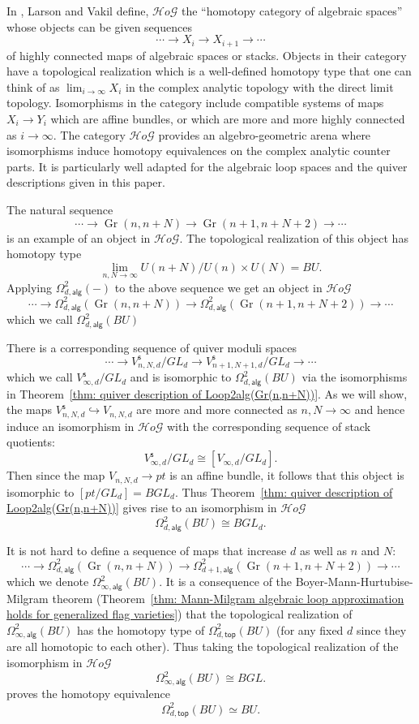 \documentclass{amsart}
\theoremstyle{definition}
\newcommand{\HoG}{\mathcal{H}o\mathcal{G}}    %
\newcommand{\alg}{\mathsf{alg}}
\newcommand{\stable}{\mathsf{s}}
\renewcommand{\top}{\mathsf{top}}
\newcommand{\Gr}{\operatorname{Gr}}
\newcommand{\LoopTwo}{\Omega^{2}_{d,\alg}}
\newcommand{\LoopTwoTop}{\Omega^{2}_{d,\top}}
\newcommand{\homotopyeq}{\simeq}
\begin{document}
In \cite{Larson-Vakil-BottPeriodicity}, Larson and Vakil define,
$\HoG$ the ``homotopy category of algebraic spaces'' whose objects can
be given sequences 
\[
\dotsb \to  X_{i} \to  X_{i+1}\to \dotsb 
\]
of highly connected maps of algebraic spaces or stacks. Objects in
their category have a topological realization which is a well-defined
homotopy type that one can think of as $\lim_{i\to \infty} X_{i}$ in
the complex analytic topology with the direct limit
topology. Isomorphisms in the category include compatible systems of
maps $X_{i} \to Y_{i}$ which are affine bundles, or which are more and
more highly connected as $i\to \infty$. The category $\HoG$ provides
an algebro-geometric arena where isomorphisms induce homotopy
equivalences on the complex analytic counter parts. It is particularly
well adapted for the algebraic loop spaces and the quiver descriptions
given in this paper.

The natural sequence
\[
\dotsb \to \Gr (n,n+N)\to \Gr (n+1,n+N+2)\to \dotsb 
\]
is an example of an object in $\HoG$. The topological realization of
this object has homotopy type
\[
\lim_{n,N\to \infty} U(n+N)/U(n)\times U(N) = BU.
\]
Applying $\LoopTwo (-)$ to the above sequence we get an object in
$\HoG$ 
\[
\dotsb \to \LoopTwo (\Gr (n,n+N))\to \LoopTwo (\Gr (n+1,n+N+2))\to \dotsb 
\]
which we call $\LoopTwo (BU)$

There is a corresponding sequence of quiver moduli spaces
\[
\dotsb \to V^{\stable}_{n,N,d}/GL_{d} \to V^{\stable}_{n+1,N+1,d}/GL_{d} \to \dotsb 
\]
which we call $V^{\stable}_{\infty ,d}/GL_{d}$ and is isomorphic to
$\LoopTwo (BU)$ via the isomorphisms in Theorem~\ref{thm: quiver
description of Loop2alg(Gr(n,n+N))}. As we will show, the
maps $V^{\stable}_{n,N,d}\hookrightarrow V_{n,N,d}$ are more and more
connected as $n,N\to \infty$ and hence induce an isomorphism in $\HoG $ with the
corresponding sequence of stack quotients:
\[
V^{\stable}_{\infty ,d}/GL_{d} \cong [V_{\infty ,d} / GL_{d}] .
\]
Then since the map $V_{n,N,d}\to pt$ is an affine bundle, it follows
that this object is isomorphic to $[pt/GL_{d}] =BGL_{d}$. Thus
Theorem~\ref{thm: quiver description of Loop2alg(Gr(n,n+N))} gives
rise to an isomorphism in $\HoG$
\[
\LoopTwo (BU)\cong BGL_{d}. 
\]

It is not hard to define a sequence of maps that increase $d$ as well as $n$ and
$N$:
\[
\dotsb \to \LoopTwo (\Gr (n,n+N))\to \Omega^{2}_{d+1,\alg} (\Gr (n+1,n+N+2))\to \dotsb 
\]
which we denote $\Omega^{2}_{\infty ,\alg}(BU)$. It is a consequence
of the Boyer-Mann-Hurtubise-Milgram theorem (Theorem~\ref{thm:
Mann-Milgram algebraic loop approximation holds for generalized flag
varieties}) that the topological realization of $\Omega^{2}_{\infty
,\alg}(BU)$ has the homotopy type of $\LoopTwoTop (BU)$ (for any fixed
$d$ since they are all homotopic to each other). Thus taking the
topological realization of the isomorphism
in $\HoG$ 
\[
\Omega^{2}_{\infty ,\alg } (BU)\cong BGL. 
\]
proves the homotopy equivalence
\[
\LoopTwoTop (BU)\homotopyeq BU .
\]
\end{document}
